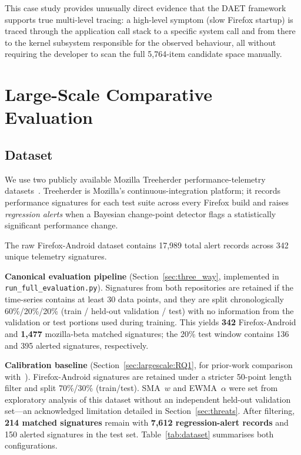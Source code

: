 \documentclass[pdflatex,sn-nature]{sn-jnl}
\theoremstyle{thmstyleone}%
\begin{document}
This case study provides unusually direct evidence that the DAET framework
supports true multi-level tracing: a high-level symptom (slow Firefox startup)
is traced through the application call stack to a specific system call and from
there to the kernel subsystem responsible for the observed behaviour, all
without requiring the developer to scan the full 5,764-item candidate space
manually.

\section{Large-Scale Comparative Evaluation}\label{sec:largescale}

\subsection{Dataset}\label{sec:largescale:dataset}

We use two publicly available Mozilla Treeherder performance-telemetry
datasets~\cite{mozillatreeherder}.
Treeherder is Mozilla's continuous-integration platform; it records
performance signatures for each test suite across every Firefox build
and raises \emph{regression alerts} when a Bayesian change-point detector
flags a statistically significant performance change.

The raw Firefox-Android dataset contains 17,989 total alert records across
342 unique telemetry signatures.

\textbf{Canonical evaluation pipeline} (Section~\ref{sec:three_way},
implemented in \texttt{run\_full\_evaluation.py}).
Signatures from both repositories are retained if the time-series contains
at least 30 data points, and they are split chronologically 60\%/20\%/20\%
(train / held-out validation / test) with no information from the validation
or test portions used during training.
This yields \textbf{342} Firefox-Android and \textbf{1{,}477} mozilla-beta
matched signatures; the 20\% test window contains 136 and 395 alerted
signatures, respectively.

\textbf{Calibration baseline} (Section~\ref{sec:largescale:RQ1},
for prior-work comparison with~\cite{10197790}).
Firefox-Android signatures are retained under a stricter 50-point length
filter and split 70\%/30\% (train/test).
SMA~$w$ and EWMA~$\alpha$ were set from exploratory analysis of this
dataset without an independent held-out validation set---an acknowledged
limitation detailed in Section~\ref{sec:threats}.
After filtering, \textbf{214 matched signatures} remain with
\textbf{7,612 regression-alert records} and 150 alerted signatures in the
test set.
Table~\ref{tab:dataset} summarises both configurations.
\end{document}
